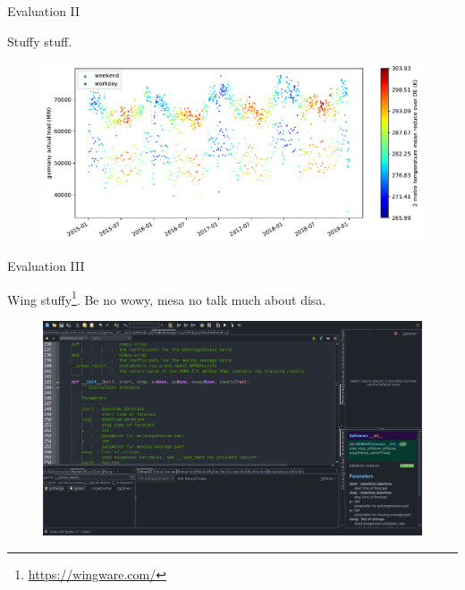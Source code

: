 \documentclass[t,xcolor={table},fleqn]{beamer}
\begin{document}
\begin{frame}{Evaluation II}

Stuffy stuff.

\begin{figure}[h!]%
\centering
\includegraphics[width=\textwidth,origin=c]{../doc/plots/t2m_mean_2015010112_2018123112_24F}%
\end{figure}

\end{frame}

\begin{frame}{Evaluation III}

Wing stuffy\footnote{\url{https://wingware.com/}}. Be no wowy, mesa no talk much about disa.

\begin{figure}[h!]%
\centering
\includegraphics[width=.8\textwidth]{../doc/logos/Predictions_Wing_001}%
\end{figure}

\end{frame}
\end{document}
